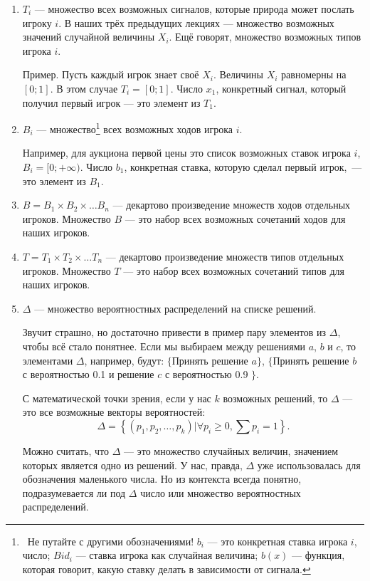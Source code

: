 \begin{enumerate}
\item $ T_{i} $ — множество всех возможных сигналов, которые природа может послать игроку $ i $. В наших трёх предыдущих лекциях — множество возможных значений случайной величины $ X_{i} $. Ещё говорят, множество возможных типов игрока $ i $.

Пример. Пусть каждый игрок знает своё $ X_{i} $. Величины $ X_{i}  $ равномерны на $ [0;1] $. В этом случае $ T_{i}=[0;1] $. Число $ x_{1} $, конкретный сигнал, который получил первый игрок — это элемент из $ T_{1} $.
\item $ B_{i} $ — множество\footnote{~Не путайте с другими обозначениями! $ b_{i} $ — это конкретная ставка игрока $ i $, число; $ Bid_{i} $ — ставка игрока как случайная величина; $ b(x) $ — функция, которая говорит, какую ставку делать в зависимости от сигнала.}  всех возможных ходов игрока $ i $.

Например, для аукциона первой цены это список возможных ставок игрока $ i $, $ B_{i}=[0;+\infty) $. Число $ b_{1} $, конкретная ставка, которую сделал первый игрок,~— это элемент из $ B_{1} $.

\item $ B=B_{1}\times B_{2}\times \ldots B_{n} $ — декартово произведение множеств ходов отдельных игроков. Множество $B$ — это набор всех возможных сочетаний ходов для наших игроков.

\item $ T=T_{1}\times T_{2}\times \ldots T_{n} $ — декартово произведение множеств типов отдельных игроков. Множество $T$ — это набор всех возможных сочетаний типов для наших игроков.

\item $ \Delta $ — множество вероятностных распределений на списке решений.

Звучит страшно, но достаточно привести в пример пару элементов из $ \Delta $, чтобы всё стало понятнее. Если мы выбираем между решениями $ a $, $ b $ и $ c $, то элементами $ \Delta $, например, будут: $ \{ $Принять решение $ a\} $, $ \{ $Принять решение $ b $ с вероятностью 0.1 и решение $c$ с вероятностью 0.9 $ \}$.

С математической точки зрения, если у нас $ k $ возможных решений, то $ \Delta $ — это все возможные векторы вероятностей:
\begin{equation}
\Delta=\left\{(p_{1},p_{2},\ldots,p_{k})|\forall p_{i}\geq 0, \sum p_{i}=1 \right\}.
\end{equation}

Можно считать, что $ \Delta $ — это множество случайных величин, значением которых является одно из решений.
У нас, правда, $ \Delta $ уже использовалась для обозначения маленького числа. Но из контекста всегда понятно, подразумевается ли под $ \Delta $ число или множество вероятностных распределений.

\end{enumerate}

